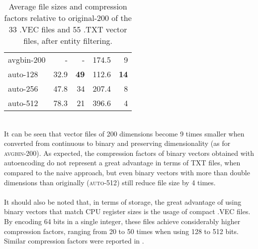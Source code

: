 \documentclass[11pt,titlepage,oneside,openany]{book}
\begin{document}
\begin{table}[h!]
{\begin{tabular}{l|rr|rr}
avgbin-200                         & -                                                                                   & -                                                                                        & 174.5                                                                               & 9                                                                                        \\
auto-128                           & 32.9                                                                                & \textbf{49}                                                                              & 112.6                                                                               & \textbf{14}                                                                              \\
auto-256                           & 47.8                                                                                & 34                                                                                       & 207.4                                                                               & 8                                                                                        \\
auto-512                           & 78.3                                                                                & 21                                                                                       & 396.6                                                                               & 4                                                                                        \\
\hline
\end{tabular}}
\caption{Average file sizes and compression factors relative to original-200 of the 33 .VEC files and 55 .TXT vector files, after entity filtering.}
\label{tab:file-sizes}
\end{table}
\\
It can be seen that vector files of 200 dimensions become 9 times smaller when converted from continuous to binary and preserving dimensionality (as for \textsc{avgbin-200}). As expected, the compression factors of binary vectors obtained with autoencoding do not represent a great advantage in terms of TXT files, when compared to the naive approach, but even binary vectors with more than double dimensions than originally (\textsc{auto-512}) still reduce file size by 4 times.\\
\\
It should also be noted that, in terms of storage, the great advantage of using binary vectors that match CPU register sizes is the usage of compact \textsc{.VEC} files. By encoding 64 bits in a single integer, these files achieve considerably higher compression factors, ranging from 20 to 50 times when using 128 to 512 bits. Similar compression factors were reported in \cite{tissier_near-lossless_2019, navali_word_2020, pan_relation_2021}.
\end{document}
